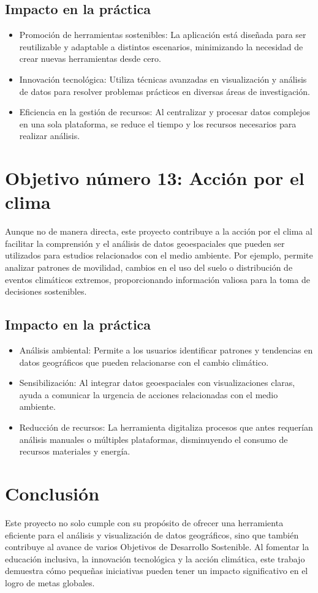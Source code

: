 \subsection{Impacto en la práctica}
\begin{itemize}
    \item Promoción de herramientas sostenibles: La aplicación está diseñada para ser reutilizable y adaptable a distintos escenarios, minimizando la necesidad de crear nuevas herramientas desde cero.
    \item Innovación tecnológica: Utiliza técnicas avanzadas en visualización y análisis de datos para resolver problemas prácticos en diversas áreas de investigación.
    \item Eficiencia en la gestión de recursos: Al centralizar y procesar datos complejos en una sola plataforma, se reduce el tiempo y los recursos necesarios para realizar análisis.
\end{itemize}

\section{Objetivo número 13: Acción por el clima}
Aunque no de manera directa, este proyecto contribuye a la acción por el clima al facilitar la comprensión y el análisis de datos geoespaciales que pueden ser utilizados para estudios relacionados con el medio ambiente. Por ejemplo, permite analizar patrones de movilidad, cambios en el uso del suelo o distribución de eventos climáticos extremos, proporcionando información valiosa para la toma de decisiones sostenibles.

\subsection{Impacto en la práctica}
\begin{itemize}
    \item Análisis ambiental: Permite a los usuarios identificar patrones y tendencias en datos geográficos que pueden relacionarse con el cambio climático.
    \item Sensibilización: Al integrar datos geoespaciales con visualizaciones claras, ayuda a comunicar la urgencia de acciones relacionadas con el medio ambiente.
    \item Reducción de recursos: La herramienta digitaliza procesos que antes requerían análisis manuales o múltiples plataformas, disminuyendo el consumo de recursos materiales y energía.
\end{itemize}

\section{Conclusión}
Este proyecto no solo cumple con su propósito de ofrecer una herramienta eficiente para el análisis y visualización de datos geográficos, sino que también contribuye al avance de varios Objetivos de Desarrollo Sostenible. Al fomentar la educación inclusiva, la innovación tecnológica y la acción climática, este trabajo demuestra cómo pequeñas iniciativas pueden tener un impacto significativo en el logro de metas globales.



